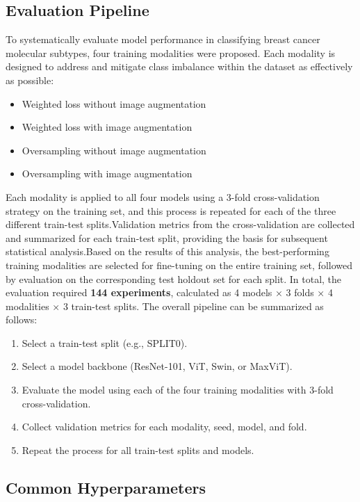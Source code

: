 \documentclass[a4paper,10pt]{book}
\begin{document}
\subsection{Evaluation Pipeline}

To systematically evaluate model performance in classifying breast cancer molecular subtypes, four training modalities were proposed. Each modality is designed to address and mitigate class imbalance within the dataset as effectively as possible:

\begin{itemize}
    \item Weighted loss without image augmentation
    \item Weighted loss with image augmentation
    \item Oversampling without image augmentation
    \item Oversampling with image augmentation
\end{itemize}

Each modality is applied to all four models using a 3-fold cross-validation strategy on the training set, and this process is repeated for each of the three different train-test splits.Validation metrics from the cross-validation are collected and summarized for each train-test split, providing the basis for subsequent statistical analysis.Based on the results of this analysis, the best-performing training modalities are selected for fine-tuning on the entire training set, followed by evaluation on the corresponding test holdout set for each split. In total, the evaluation required \textbf{144 experiments}, calculated as 4 models × 3 folds × 4 modalities × 3 train-test splits. The overall pipeline can be summarized as follows:

\begin{enumerate}[label=\textbf{Step \arabic*}:]
    \item Select a train-test split (e.g., SPLIT0).
    \item Select a model backbone (ResNet-101, ViT, Swin, or MaxViT).
    \item Evaluate the model using each of the four training modalities with 3-fold cross-validation.
    \item Collect validation metrics for each modality, seed, model, and fold.
    \item Repeat the process for all train-test splits and models.
\end{enumerate}

\subsection{Common Hyperparameters}
\end{document}
